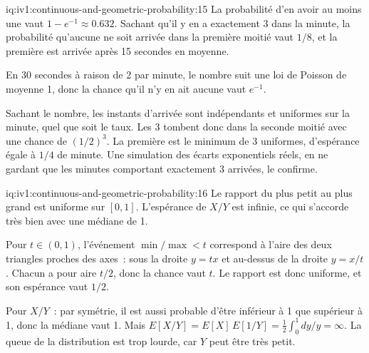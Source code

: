\begin{solution}{iq:iv1:continuous-and-geometric-probability:15}
La probabilité d'en avoir au moins une vaut $1 - e^{-1} \approx 0.632$. Sachant qu'il y en a exactement 3 dans la minute, la probabilité qu'aucune ne soit arrivée dans la première moitié vaut $1/8$, et la première est arrivée après 15 secondes en moyenne.

En 30 secondes à raison de 2 par minute, le nombre suit une loi de Poisson de moyenne 1, donc la chance qu'il n'y en ait aucune vaut $e^{-1}$.

Sachant le nombre, les instants d'arrivée sont indépendants et uniformes sur la minute, quel que soit le taux. Les 3 tombent donc dans la seconde moitié avec une chance de $(1/2)^3$. La première est le minimum de 3 uniformes, d'espérance égale à $1/4$ de minute. Une simulation des écarts exponentiels réels, en ne gardant que les minutes comportant exactement 3 arrivées, le confirme.

\end{solution}

\begin{solution}{iq:iv1:continuous-and-geometric-probability:16}
Le rapport du plus petit au plus grand est uniforme sur $[0, 1]$. L'espérance de $X/Y$ est infinie, ce qui s'accorde très bien avec une médiane de 1.

Pour $t \in (0, 1)$, l'événement $\min/\max < t$ correspond à l'aire des deux triangles proches des axes~: sous la droite $y = tx$ et au-dessus de la droite $y = x/t$. Chacun a pour aire $t/2$, donc la chance vaut $t$. Le rapport est donc uniforme, et son espérance vaut $1/2$.

Pour $X/Y$~: par symétrie, il est aussi probable d'être inférieur à 1 que supérieur à 1, donc la médiane vaut 1. Mais $E[X/Y] = E[X]\,E[1/Y] = \tfrac12 \int_0^1 dy/y = \infty$. La queue de la distribution est trop lourde, car $Y$ peut être très petit.

\end{solution}

